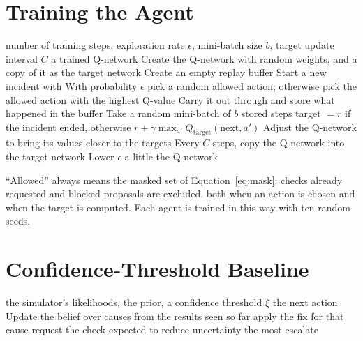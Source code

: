 \section{Training the Agent}

\begin{algorithm}[H]
\caption{Training the deep Q-network}
\label{alg:dqn}
\begin{algorithmic}[1]
\Require number of training steps, exploration rate $\epsilon$, mini-batch size $b$, target update interval $C$
\Ensure a trained Q-network
\State Create the Q-network with random weights, and a copy of it as the target network
\State Create an empty replay buffer
\Repeat
  \State Start a new incident with  
    \State With probability $\epsilon$ pick a random allowed action;
    \State \hspace{1em} otherwise pick the allowed action with the highest Q-value
    \State Carry it out through  and store what happened in the buffer
    \State Take a random mini-batch of $b$ stored steps
      \State target $= r$ if the incident ended, otherwise $r + \gamma \max_{a'} Q_{\text{target}}(\text{next}, a')$
    \EndFor
    \State Adjust the Q-network to bring its values closer to the targets 
    \State Every $C$ steps, copy the Q-network into the target network
    \State Lower $\epsilon$ a little
  \EndWhile
{}
\State \Return the Q-network
\end{algorithmic}
\end{algorithm}

``Allowed'' always means the masked set of Equation~\eqref{eq:mask}: checks already requested and blocked proposals are excluded, both when an action is chosen and when the target is computed. Each agent is trained in this way with ten random seeds.

\section{Confidence-Threshold Baseline}

\begin{algorithm}[H]
\caption{Confidence-threshold baseline}
\label{alg:threshold}
\begin{algorithmic}[1]
\Require the simulator's likelihoods, the prior, a confidence threshold $\xi$
\Ensure the next action
  \State Update the belief over causes from the results seen so far 
    \State \Return apply the fix for that cause
    \State \Return request the check expected to reduce uncertainty the most
  \Else
    \State \Return escalate
  \EndIf
\EndProcedure
\end{algorithmic}
\end{algorithm}

